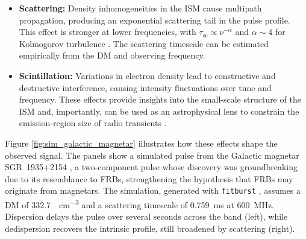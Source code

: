 \begin{itemize}
			Faraday rotation arises because the left- and right-handed circular polarization components experience different refractive indices in a magnetized plasma, producing a phase delay that accumulates along the propagation path and leads to the characteristic $\nu^{-2}$ dependence of $\chi$ \citep{RM}. Measurements of RM therefore provide a sensitive probe of magnetized plasma in the intervening \gls{ism} and \gls{igm}.

			Interestingly, recent observations of FRB~20221022A revealed an S-shaped swing in the polarization position angle, closely resembling features commonly observed in pulsars. Although the nature of these sources will be discussed in later sections (\S\ref{sec:pulsars} and \S\ref{sec:frbs}), this similarity has been interpreted as suggestive evidence that at least some of them may share related emission environments or mechanisms \citep{2025Natur.637...43M}.

			\item \textbf{Scattering:} Density inhomogeneities in the ISM cause multipath propagation, producing an exponential scattering tail in the pulse profile. This effect is stronger at lower frequencies, with $\tau_{\text{sc}} \propto \nu^{-\alpha}$ and $\alpha \sim 4$ for Kolmogorov turbulence \citep{Rickett_1977}. The scattering timescale can be estimated empirically from the DM and observing frequency.

			\item \textbf{Scintillation:} Variations in electron density lead to constructive and destructive interference, causing intensity fluctuations over time and frequency. These effects provide insights into the small-scale structure of the ISM and, importantly, can be used as an astrophysical lens to constrain the emission-region size of radio transients \citep{Scintillation_FRB_Nimmo_2025}.
\end{itemize}
Figure \ref{fig:sim_galactic_magnetar} illustrates how these effects shape the observed signal. The panels show a simulated pulse from the Galactic magnetar SGR~1935+2154 \citep{Galactic_magnetar, Bochenek_2020}, a two-component pulse whose discovery was groundbreaking due to its resemblance to FRBs, strengthening the hypothesis that FRBs may originate from magnetars. The simulation, generated with \texttt{fitburst} \citep{fonseca2024modelingmorphologyfastradio}, assumes a DM of \SI{332.7}{\parsec \per \centi \meter^3} and a scattering timescale of \SI{0.759}{\milli \second} at \SI{600}{\mega \hertz}. Dispersion delays the pulse over several seconds across the band (left), while dedispersion recovers the intrinsic profile, still broadened by scattering (right).

